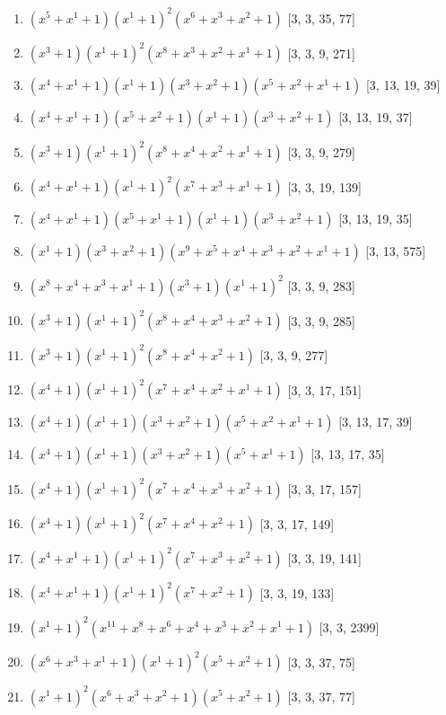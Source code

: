 \documentclass[10pt,twocolumn]{article}
\begin{document}
\begin{enumerate}
\item $(x^{5} + x^{1} + 1)(x^{1} + 1)^{2}(x^{6} + x^{3} + x^{2} + 1)$  [3, 3, 35, 77]
\item $(x^{3} + 1)(x^{1} + 1)^{2}(x^{8} + x^{3} + x^{2} + x^{1} + 1)$  [3, 3, 9, 271]
\item $(x^{4} + x^{1} + 1)(x^{1} + 1)(x^{3} + x^{2} + 1)(x^{5} + x^{2} + x^{1} + 1)$  [3, 13, 19, 39]
\item $(x^{4} + x^{1} + 1)(x^{5} + x^{2} + 1)(x^{1} + 1)(x^{3} + x^{2} + 1)$  [3, 13, 19, 37]
\item $(x^{3} + 1)(x^{1} + 1)^{2}(x^{8} + x^{4} + x^{2} + x^{1} + 1)$  [3, 3, 9, 279]
\item $(x^{4} + x^{1} + 1)(x^{1} + 1)^{2}(x^{7} + x^{3} + x^{1} + 1)$  [3, 3, 19, 139]
\item $(x^{4} + x^{1} + 1)(x^{5} + x^{1} + 1)(x^{1} + 1)(x^{3} + x^{2} + 1)$  [3, 13, 19, 35]
\item $(x^{1} + 1)(x^{3} + x^{2} + 1)(x^{9} + x^{5} + x^{4} + x^{3} + x^{2} + x^{1} + 1)$  [3, 13, 575]
\item $(x^{8} + x^{4} + x^{3} + x^{1} + 1)(x^{3} + 1)(x^{1} + 1)^{2}$  [3, 3, 9, 283]
\item $(x^{3} + 1)(x^{1} + 1)^{2}(x^{8} + x^{4} + x^{3} + x^{2} + 1)$  [3, 3, 9, 285]
\item $(x^{3} + 1)(x^{1} + 1)^{2}(x^{8} + x^{4} + x^{2} + 1)$  [3, 3, 9, 277]
\item $(x^{4} + 1)(x^{1} + 1)^{2}(x^{7} + x^{4} + x^{2} + x^{1} + 1)$  [3, 3, 17, 151]
\item $(x^{4} + 1)(x^{1} + 1)(x^{3} + x^{2} + 1)(x^{5} + x^{2} + x^{1} + 1)$  [3, 13, 17, 39]
\item $(x^{4} + 1)(x^{1} + 1)(x^{3} + x^{2} + 1)(x^{5} + x^{1} + 1)$  [3, 13, 17, 35]
\item $(x^{4} + 1)(x^{1} + 1)^{2}(x^{7} + x^{4} + x^{3} + x^{2} + 1)$  [3, 3, 17, 157]
\item $(x^{4} + 1)(x^{1} + 1)^{2}(x^{7} + x^{4} + x^{2} + 1)$  [3, 3, 17, 149]
\item $(x^{4} + x^{1} + 1)(x^{1} + 1)^{2}(x^{7} + x^{3} + x^{2} + 1)$  [3, 3, 19, 141]
\item $(x^{4} + x^{1} + 1)(x^{1} + 1)^{2}(x^{7} + x^{2} + 1)$  [3, 3, 19, 133]
\item $(x^{1} + 1)^{2}(x^{11} + x^{8} + x^{6} + x^{4} + x^{3} + x^{2} + x^{1} + 1)$  [3, 3, 2399]
\item $(x^{6} + x^{3} + x^{1} + 1)(x^{1} + 1)^{2}(x^{5} + x^{2} + 1)$  [3, 3, 37, 75]
\item $(x^{1} + 1)^{2}(x^{6} + x^{3} + x^{2} + 1)(x^{5} + x^{2} + 1)$  [3, 3, 37, 77]

\end{enumerate}
\end{document}
